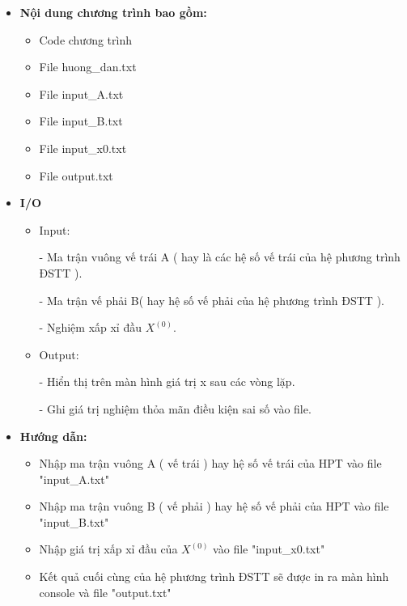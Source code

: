 \documentclass[12pt,a4paper]{article}
\begin{document}
{\renewcommand{\labelitemi}{$\blacksquare$}
\renewcommand\labelitemii{$\nabla$}
\renewcommand\labelitemiii{$\square$}
\begin{itemize}
\item{\textbf{Nội dung chương trình bao gồm: }}
\begin{itemize}
\item Code chương trình 
\item File huong\_dan.txt
\item File input\_A.txt
\item File input\_B.txt
\item File input\_x0.txt
\item File output.txt
\end{itemize}
\end{itemize}

\begin{itemize}
\item{\textbf{I/O }}
\begin{itemize}
\item Input: 

- Ma trận vuông vế trái A ( hay là các hệ số vế trái của hệ phương trình ĐSTT ).

- Ma trận vế phải B( hay hệ số vế phải của hệ phương trình ĐSTT ).

- Nghiệm xấp xỉ đầu $ X^{(0)}$.

\item Output:

- Hiển thị trên màn hình giá trị x sau các vòng lặp.

- Ghi giá trị nghiệm thỏa mãn điều kiện sai số vào file.
\end{itemize}
\end{itemize}

\begin{itemize}
\item{\textbf{Hướng dẫn: }}
\begin{itemize}
\item Nhập ma trận vuông A ( vế trái ) hay hệ số vế trái của HPT vào file "input\_A.txt"
\item Nhập ma trận vuông B ( vế phải ) hay hệ số vế phải của HPT vào file "input\_B.txt"
\item Nhập giá trị xấp xỉ đầu của $ X^{(0)}$ vào file "input\_x0.txt"
\item Kết quả cuối cùng của hệ phương trình ĐSTT sẽ được in ra màn hình console và file "output.txt"
\end{itemize}
\end{itemize}

}
\end{document}
